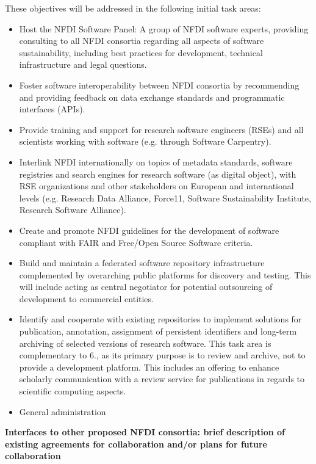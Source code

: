 \documentclass[11pt,a4paper]{scrlttr2}
\begin{document}
\begin{letter}{}
These objectives will be addressed in the following initial task areas:
\begin{itemize}
 \item Host the NFDI Software Panel: A group of NFDI software experts, providing consulting to all NFDI consortia regarding all aspects of software sustainability, including best practices for development, technical infrastructure and legal questions.
 \item Foster software interoperability between NFDI consortia by recommending and providing feedback on data exchange standards and programmatic interfaces (APIs).
 \item Provide training and support for research software engineers (RSEs) and all scientists  working with software (e.g. through Software Carpentry).
 \item Interlink NFDI internationally on topics of metadata standards, software registries and search engines for research software (as digital object), with RSE organizations and other stakeholders on European and international levels (e.g. Research Data Alliance, Force11, Software Sustainability Institute, Research Software Alliance).
 \item Create and promote NFDI guidelines for the development of software compliant with FAIR and Free/Open Source Software criteria.
 \item Build and maintain a federated software repository infrastructure complemented by overarching public platforms for discovery and testing. This will include acting as central negotiator for potential outsourcing of development to commercial entities.
 \item Identify and cooperate with existing repositories to implement solutions for publication, annotation, assignment of persistent identifiers and long-term archiving of selected versions of research software. This task area is complementary to 6., as its primary purpose is to review and archive, not to provide a development platform. This includes an offering to enhance scholarly communication with a review service for publications in regards to scientific computing aspects.
\item General administration
\end{itemize}

\clearpage
\textbf{Interfaces to other proposed NFDI consortia: brief description of existing agreements for collaboration and/or plans for future collaboration}\\


\end{letter}
\end{document}
